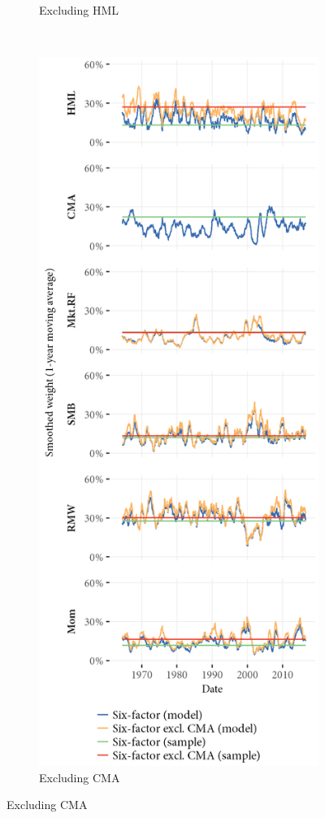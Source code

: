 \begin{figure}[htbp]
\begin{subfigure}{0.45\textwidth}
    \caption{Excluding HML}
  \end{subfigure}
  ~
  \begin{subfigure}{0.45\textwidth}
    \includegraphics[width=\textwidth]{graphics/Weights_6F_EXCL_CMA_6F.png}
    \caption{Excluding CMA}
  \end{subfigure}
\end{figure}




